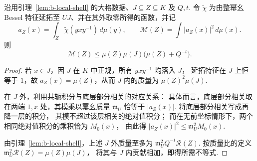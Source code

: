 \begin{lemma}[局部共轭质量的主项与壳层误差]
\label{lem:b-local-mass}
\emitthmsource
沿用引理~\ref{lem:b-local-shell} 的大格数据、$J\subseteq Z\subseteq K$ 及 $Q,t$.
令 $\widetilde\chi$ 为由整幂幺 Bessel 特征延拓至 $U J$、并在其外取零所得的函数，并记
\[
 a_Z(x)=\int_Z\widetilde\chi(yxy^{-1})\,d\mu(y),
 \qquad
 \mathcal M(Z)=\int |a_Z(x)|^2\,d\mu(x).
\]
则
\[
 \mathcal M(Z)\le\mu(Z)\mu(J)\bigl(\mu(Z)+Q^{-t}\bigr).
\]
\end{lemma}
\begin{proof}
若 $x\in J$，因 $J$ 在 $K$ 中正规，所有 $yxy^{-1}$ 均落入 $J$，
延拓特征在 $J$ 上恒等于 $1$，故 $a_Z(x)=\mu(Z)$，从而 $J$ 内的质量为 $\mu(Z)^2\mu(J)$.

在 $J$ 外，利用共轭积分与底层部分相关的对应关系：
具体而言，底层部分相关取在两端 $1,x$ 处，其模乘以幂幺质量 $\mathfrak m_U$
恰等于 $|a_Z(x)|$. 将底层部分相关写成再降一层的积分，
其模不超过该层相关的绝对值积分；
而在无前坐标情形下，两个相同绝对值积分的乘积恰为 $M_0(x)$，
由此得 $|a_Z(x)|^2\le\mathfrak m_U^2M_0(x)$.

由引理~\ref{lem:b-local-shell}，上述 $J$ 外质量至多为
$\mathfrak m_U^2 Q^{-t}\mathcal R(Z)$.
按质量比的定义 $\mathfrak m_U^2\mathcal R(Z)=\mu(Z)\mu(J)$，
将其与 $J$ 内贡献相加，即得所需不等式.
\end{proof}

